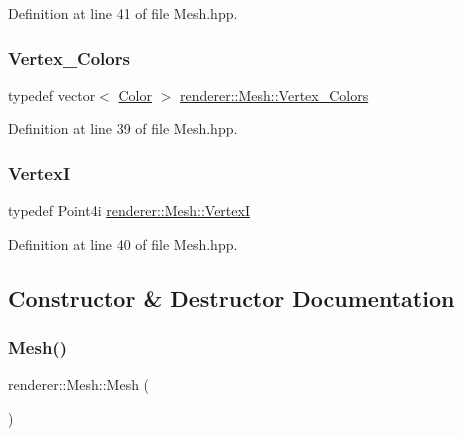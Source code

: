Definition at line 41 of file Mesh.\+hpp.

\mbox{\label{classrenderer_1_1_mesh_ab384ccca7ccccac4b935fe797ce0a7ea}} 
\subsubsection{\texorpdfstring{Vertex\_Colors}{Vertex\_Colors}}
{\footnotesize\ttfamily typedef vector$<$ \mbox{\hyperlink{classrenderer_1_1_mesh_a71276bd4511d4593f1deaae6d464e811}{Color}} $>$ \mbox{\hyperlink{classrenderer_1_1_mesh_ab384ccca7ccccac4b935fe797ce0a7ea}{renderer\+::\+Mesh\+::\+Vertex\+\_\+\+Colors}}}



Definition at line 39 of file Mesh.\+hpp.

\mbox{\label{classrenderer_1_1_mesh_a5fd87426b3c8820d68414531423446fc}} 
\subsubsection{\texorpdfstring{VertexI}{VertexI}}
{\footnotesize\ttfamily typedef Point4i \mbox{\hyperlink{classrenderer_1_1_mesh_a5fd87426b3c8820d68414531423446fc}{renderer\+::\+Mesh\+::\+VertexI}}}



Definition at line 40 of file Mesh.\+hpp.



\subsection{Constructor \& Destructor Documentation}
\mbox{\label{classrenderer_1_1_mesh_a9599aef3cd7b6e8b4643a408445f272b}} 
\subsubsection{\texorpdfstring{Mesh()}{Mesh()}}
{\footnotesize\ttfamily renderer\+::\+Mesh\+::\+Mesh (\begin{DoxyParamCaption}{ }\end{DoxyParamCaption})\hspace{0.3cm}{\ttfamily [default]}}



